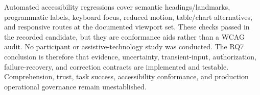 Automated accessibility regressions cover semantic headings/landmarks, programmatic labels, keyboard focus, reduced motion, table/chart alternatives, and responsive routes at the documented viewport set. These checks passed in the recorded candidate, but they are conformance aids rather than a WCAG audit. No participant or assistive-technology study was conducted. The RQ7 conclusion is therefore that evidence, uncertainty, transient-input, authorization, failure-recovery, and correction contracts are implemented and testable. Comprehension, trust, task success, accessibility conformance, and production operational governance remain unestablished.
